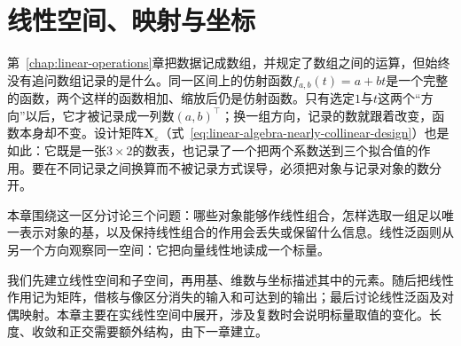 \chapter{线性空间、映射与坐标}
\label{chap:linear-representation}
\label{chap:linear-algebra-and-matrix-analysis}
\label{chap:linear-algebra}

第~\ref{chap:linear-operations}章把数据记成数组，并规定了数组之间的运算，但始终没有追问数组记录的是什么。同一区间上的仿射函数$f_{a,b}(t)=a+bt$是一个完整的函数，两个这样的函数相加、缩放后仍是仿射函数。只有选定$1$与$t$这两个“方向”以后，它才被记录成一列数$(a,b)^{\top}$；换一组方向，记录的数就跟着改变，函数本身却不变。设计矩阵$\bm X_\varepsilon$（式~\eqref{eq:linear-algebra-nearly-collinear-design}）也是如此：它既是一张$3\times2$的数表，也记录了一个把两个系数送到三个拟合值的作用。要在不同记录之间换算而不被记录方式误导，必须把对象与记录对象的数分开。

本章围绕这一区分讨论三个问题：哪些对象能够作线性组合，怎样选取一组足以唯一表示对象的基，以及保持线性组合的作用会丢失或保留什么信息。线性泛函则从另一个方向观察同一空间：它把向量线性地读成一个标量。

我们先建立线性空间和子空间，再用基、维数与坐标描述其中的元素。随后把线性作用记为矩阵，借核与像区分消失的输入和可达到的输出；最后讨论线性泛函及对偶映射。本章主要在实线性空间中展开，涉及复数时会说明标量取值的变化。长度、收敛和正交需要额外结构，由下一章建立。






